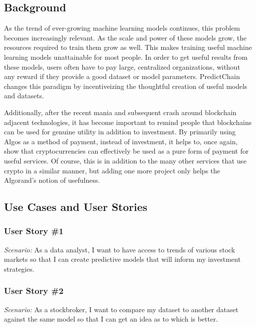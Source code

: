 \documentclass{article}
\begin{document}
    \subsection{Background}

    As the trend of ever-growing machine learning models continues, this problem becomes increasingly relevant.
    As the scale and power of these models grow, the resources required to train them grow as well.  This makes training
    useful machine learning models unattainable for most people.  In order to get useful results from these models,
    users often have to pay large, centralized organizations, without any reward if they provide a good dataset or model
    parameters.  PredictChain changes this paradigm by incentiveizing the thoughtful creation of useful models and
    datasets.

    Additionally, after the recent mania and subsequent crash around blockchain adjacent technologies, it has become
    important to remind people that blockchains can be used for genuine utility in addition to investment.  By primarily
    using Algos as a method of payment, instead of investment, it helps to, once again, show that cryptocurrencies can
    effectively be used as a pure form of payment for useful services.  Of course, this is in addition to the many other
    services that use crypto in a similar manner, but adding one more project only helps the Algorand's notion of usefulness.


    \subsection{Use Cases and User Stories}

    \subsubsection*{User Story \#1}
    \textit{Scenario:} As a data analyst, I want to have access to trends of various stock markets so that I can create
    predictive models that will inform my investment strategies.

    \subsubsection*{User Story \#2}
    \textit{Scenario:} As a stockbroker, I want to compare my dataset to another dataset against the same model so that
    I can get an idea as to which is better.
\end{document}
